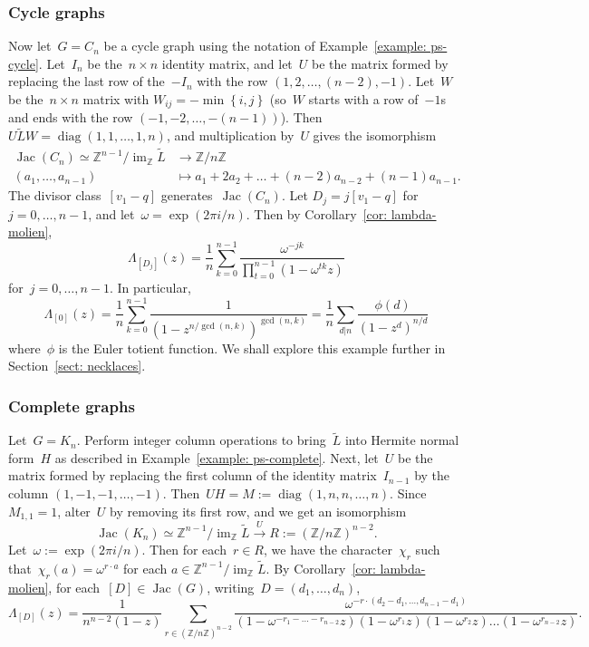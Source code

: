 \documentclass{amsart}
\DeclareMathOperator{\Jac}{Jac}
\DeclareMathOperator{\diag}{diag}
\DeclareMathOperator{\im}{im}
\newcommand{\Z}{\mathbb{Z}}
\newcommand{\tL}{\tilde{L}}
\begin{document}
\subsubsection{Cycle graphs} Now let~$G=C_n$ be a cycle graph using the notation
of Example~\ref{example: ps-cycle}. Let~$I_n$ be the~$n\times n$ identity matrix,
and let~$U$ be the matrix formed by replacing
the last row of the~$-I_n$ with the row
$(1,2,\dots,(n-2),-1)$.  Let~$W$ be the~$n\times n$ matrix with
$W_{ij}=-\min\left\{ i,j \right\}$ (so~$W$ starts with a row of~$-1$s and ends
  with the row $(-1,-2,\dots,-(n-1))$).  Then~$U\tL W=\diag(1,1,\dots,1,n)$,
  and multiplication by~$U$ gives the isomorphism
\begin{align*}
  \Jac(C_n)\simeq\Z^{n-1}/\im_{\Z}\tL&\to\Z/n\Z\\
  (a_1,\dots,a_{n-1})&\mapsto a_1+2a_2+\dots+(n-2)a_{n-2}+(n-1)a_{n-1}.
\end{align*}
The divisor class~$[v_{1}-q]$ generates~$\Jac(C_n)$. Let $D_j=j[v_{1}-q]$
for~$j=0,\dots,n-1$, and let~$\omega=\exp(2\pi i/n)$.  Then by
Corollary~\ref{cor: lambda-molien},
\[
  \Lambda_{[D_j]}(z)
  =
  \frac{1}{n}\sum_{k=0}^{n-1}\frac{\omega^{-jk}}{\prod_{t=0}^{n-1}(1-\omega^{tk}z)}
\]
for~$j=0,\dots,n-1$.  In particular,
\[
  \Lambda_{[0]}(z)=\frac{1}{n}\sum_{k=0}^{n-1}\frac{1}{(1-z^{n/\gcd(n,k)})^{\gcd(n,k)}}
  =\frac{1}{n}\sum_{d|n}\frac{\phi(d)}{(1-z^d)^{n/d}}
\]
where~$\phi$ is the Euler totient function. We shall explore this example
further in Section~\ref{sect: necklaces}.  

\subsubsection{Complete graphs} Let~$G=K_n$.  Perform integer column operations
to bring~$\tL$ into Hermite normal form~$H$ as described in Example~\ref{example:
ps-complete}. Next, let~$U$ be the matrix formed by replacing the first column
of the identity matrix~$I_{n-1}$ by the column $(1,-1,-1,\dots,-1)$.
Then~$UH = M:=\diag(1,n,n,\dots,n)$.  Since~$M_{1,1}=1$, alter~$U$ by removing
its first row, and we get an
isomorphism
\[
  \Jac(K_n)\simeq\Z^{n-1}/\im_{\Z}\tL\xrightarrow{U}R:=\left(\Z/n\Z  \right)^{n-2}.
\]
Let~$\omega:=\exp(2\pi i/n)$.  Then for each~$r\in R$, we have the
character~$\chi_r$ such that~$\chi_r(a)=\omega^{r\cdot a}$ for
each $a\in\Z^{n-1}/\im_{\Z}\tL$.  By Corollary~\ref{cor: lambda-molien}, for
each~$[D]\in\Jac(G)$, writing~$D=(d_1,\dots,d_n)$, 
\[
  \Lambda_{[D]}(z)=\frac{1}{n^{n-2}(1-z)}\sum_{r\in
  (\Z/n\Z)^{n-2}}\frac{\omega^{-r\cdot(d_2-d_1,\dots,d_{n-1}-d_1)}}{(1-\omega^{-r_1-\dots-r_{n-2}}z)(1-\omega^{r_1}z)(1-\omega^{r_2}z)\dots(1-\omega^{r_{n-2}}z)}.
\]
\end{document}
